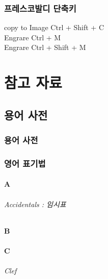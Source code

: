 \documentclass[12pt, a4paper, oneside]{book}
\let\stdsection\section
\renewcommand\section{\newpage\stdsection}
\begin{document}
	\section{프레스코발디 단축키}

copy to Image   Ctrl + Shift + C \\
Engrare  	Ctrl + M \\
Engrare  	Ctrl + Shift + M \\




	\part{참고 자료}
	\noptcrule
	\parttoc				


	\chapter{용어 사전}
	\noptcrule
	\parttoc				

	\section{용어 사전}


	\section{영어 표기법}

	\subsection{A}

\paragraph{Accidentals : 임시표}


	\subsection{B}

	\subsection{C}

\paragraph{Clef}
\end{document}

